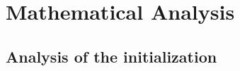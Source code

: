 \section{Mathematical Analysis}
\label{sec:mathanalysis}
\subsection{Analysis of the initialization}
%
%
%
%
%
%
%

